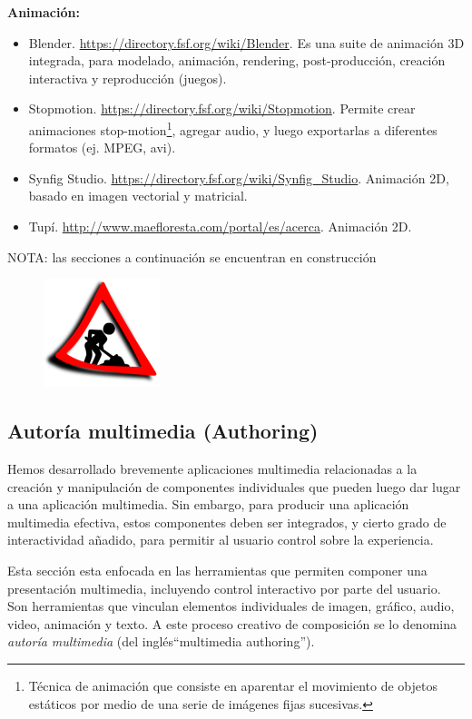 \documentclass[12pt]{article}
\begin{document}
{\bf Animación:}
\begin{itemize}
\item Blender. \url{https://directory.fsf.org/wiki/Blender}. Es una suite de
animación  3D integrada, para modelado, animación, rendering, post-producción, creación 
interactiva y reproducción (juegos). 
\item Stopmotion. \url{https://directory.fsf.org/wiki/Stopmotion}. Permite
crear animaciones stop-motion\footnote{Técnica de animación que consiste 
en aparentar el movimiento de objetos estáticos por medio de una serie de 
imágenes fijas sucesivas.}, agregar audio, y luego exportarlas a 
diferentes formatos (ej. MPEG, avi). 
\item Synfig Studio. \url{https://directory.fsf.org/wiki/Synfig_Studio}. 
Animación 2D, basado en imagen vectorial y matricial. 
\item Tupí. \url{http://www.maefloresta.com/portal/es/acerca}. Animación
2D. 
\end{itemize}

\textcolor[rgb]{1,0,0}{NOTA: las secciones a continuación se encuentran en 
construcción}

\begin{figure}[h]
\centering
\includegraphics{UN_CONSTRUCTION_2ss.png}
\renewcommand{\figurename}{Fig.}
\label{contexto:figura}
\end{figure}

\subsection*{Autoría multimedia (Authoring)}

Hemos desarrollado brevemente aplicaciones multimedia relacionadas a la 
creación y manipulación de componentes individuales que pueden luego 
dar lugar a una aplicación multimedia. Sin embargo, para producir 
una aplicación multimedia efectiva, estos componentes deben ser 
integrados, y cierto grado de interactividad añadido, para permitir
al usuario control sobre la experiencia. 

Esta sección esta enfocada en las herramientas que permiten componer una 
presentación multimedia, incluyendo 
control interactivo por parte del usuario. Son herramientas que vinculan 
elementos individuales de imagen, gráfico, audio, video, animación y texto. 
A este proceso creativo de composición se lo denomina {\it autoría multimedia} 
(del inglés``multimedia authoring''). 
\end{document}
